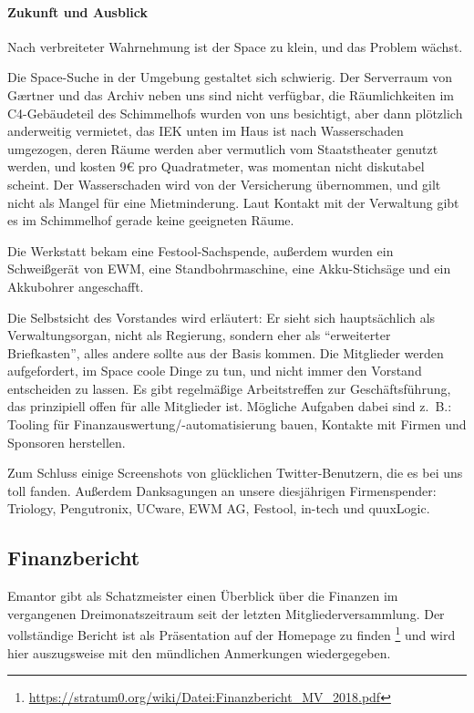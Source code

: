 \documentclass{s0minutes}
\begin{document}
\paragraph{Zukunft und Ausblick}

Nach verbreiteter Wahrnehmung ist der Space zu klein, und das Problem wächst.

Die Space-Suche in der Umgebung gestaltet sich schwierig. Der Serverraum von
G\ae{}rtner und das Archiv neben uns sind nicht verfügbar, die Räumlichkeiten im
C4-Gebäudeteil des Schimmelhofs wurden von uns besichtigt, aber dann plötzlich
anderweitig vermietet, das IEK unten im Haus ist nach Wasserschaden umgezogen,
deren Räume werden aber vermutlich vom Staatstheater genutzt werden, und kosten
9€ pro Quadratmeter, was momentan nicht diskutabel scheint. Der Wasserschaden
wird von der Versicherung übernommen, und gilt nicht als Mangel für eine
Mietminderung. Laut Kontakt mit der Verwaltung gibt es im Schimmelhof gerade
keine geeigneten Räume.

Die Werkstatt bekam eine Festool-Sachspende, außerdem wurden ein Schweißgerät
von EWM, eine Standbohrmaschine, eine Akku-Stichsäge und ein Akkubohrer
angeschafft.

Die Selbstsicht des Vorstandes wird erläutert: Er sieht sich hauptsächlich als
Verwaltungsorgan, nicht als Regierung, sondern eher als "`erweiterter
Briefkasten"', alles andere sollte aus der Basis kommen.  Die Mitglieder werden
aufgefordert, im Space coole Dinge zu tun, und nicht immer den Vorstand
entscheiden zu lassen.  Es gibt regelmäßige Arbeitstreffen zur Geschäftsführung,
das prinzipiell offen für alle Mitglieder ist. Mögliche Aufgaben dabei sind
z.~B.: Tooling für Finanzauswertung/-automatisierung bauen, Kontakte mit Firmen
und Sponsoren herstellen.

Zum Schluss einige Screenshots von glücklichen Twitter-Benutzern, die es bei uns
toll fanden. Außerdem Danksagungen an unsere diesjährigen Firmenspender:
Triology, Pengutronix, UCware, EWM AG, Festool, in-tech und quuxLogic.


\subsection{Finanzbericht}

Emantor gibt als Schatzmeister einen Überblick über die Finanzen im
vergangenen Dreimonatszeitraum seit der letzten Mitgliederversammlung. Der
vollständige Bericht ist als Präsentation auf der Homepage zu finden%
\footnote{\url{https://stratum0.org/wiki/Datei:Finanzbericht_MV_2018.pdf}}
und wird hier auszugsweise mit den mündlichen Anmerkungen wiedergegeben.
\end{document}
